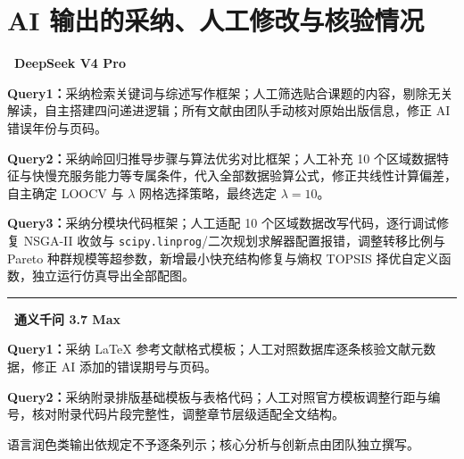 \documentclass[12pt,a4paper]{ctexart}
\begin{document}
\section{AI 输出的采纳、人工修改与核验情况}

\noindent\textbf{\textbullet~DeepSeek V4 Pro}

\textbf{Query1：}采纳检索关键词与综述写作框架；人工筛选贴合课题的内容，剔除无关解读，自主搭建四问递进逻辑；所有文献由团队手动核对原始出版信息，修正 AI 错误年份与页码。

\textbf{Query2：}采纳岭回归推导步骤与算法优劣对比框架；人工补充 10 个区域数据特征与快慢充服务能力等专属条件，代入全部数据验算公式，修正共线性计算偏差，自主确定 LOOCV 与 $\lambda$ 网格选择策略，最终选定 $\lambda=10$。

\textbf{Query3：}采纳分模块代码框架；人工适配 10 个区域数据改写代码，逐行调试修复 NSGA-II 收敛与 \verb|scipy.linprog|/二次规划求解器配置报错，调整转移比例与 Pareto 种群规模等超参数，新增最小快充结构修复与熵权 TOPSIS 择优自定义函数，独立运行仿真导出全部配图。

\noindent\rule{\linewidth}{0.4pt}

\noindent\textbf{\textbullet~通义千问 3.7 Max}

\textbf{Query1：}采纳 LaTeX 参考文献格式模板；人工对照数据库逐条核验文献元数据，修正 AI 添加的错误期号与页码。

\textbf{Query2：}采纳附录排版基础模板与表格代码；人工对照官方模板调整行距与编号，核对附录代码片段完整性，调整章节层级适配全文结构。

语言润色类输出依规定不予逐条列示；核心分析与创新点由团队独立撰写。
\end{document}
